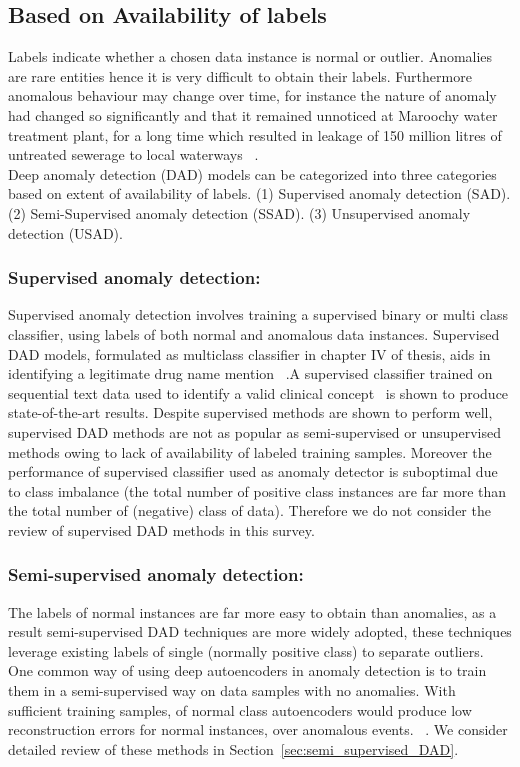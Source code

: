 \subsection{Based on Availability of labels}
Labels indicate whether a chosen data instance is normal or outlier. Anomalies are rare entities hence it is very  difficult to obtain their labels. Furthermore anomalous behaviour may change over time, for instance  the nature of anomaly had changed so significantly and that it  remained unnoticed at Maroochy water treatment plant, for a long time which resulted in leakage of 150 million litres of untreated sewerage to local waterways ~\cite{ramotsoela2018survey}.\\
Deep anomaly detection (DAD) models can be categorized into three categories based on extent of availability of labels. (1) Supervised anomaly detection (SAD). (2) Semi-Supervised anomaly detection (SSAD). (3) Unsupervised anomaly detection (USAD).

\subsubsection{Supervised anomaly detection:}
\label{supervised_learning}
Supervised anomaly detection involves training a supervised binary or multi class classifier, using labels of both normal and anomalous data instances. Supervised DAD models, formulated as multiclass classifier in chapter IV of thesis, aids in identifying a legitimate drug name mention ~\cite{chalapathy2016investigation}.A supervised classifier trained on sequential text data used to identify a valid clinical concept~\cite{chalapathy2016bidirectional} is shown to produce state-of-the-art results.
Despite supervised methods are shown to perform well, supervised DAD methods are not as popular as semi-supervised or unsupervised methods owing to lack of availability of labeled training samples. Moreover the performance of supervised classifier used as anomaly detector is suboptimal due to class imbalance (the total number of positive class instances are far more than the total number of (negative) class of data). Therefore we do not consider the review of supervised DAD methods in this survey.


\subsubsection{Semi-supervised anomaly detection:}
\label{semi_supervised_learning}
The labels of normal instances are far more easy to obtain than anomalies, as a result semi-supervised DAD techniques are more widely adopted, these techniques leverage existing labels of single (normally positive class) to separate outliers. One common way of using deep autoencoders  in anomaly detection is to train them in a semi-supervised way on data samples with no anomalies. With sufficient training samples, of normal class autoencoders would produce low reconstruction errors for normal instances, over anomalous events.
~\cite{wulsin2010semi,nadeem2016semi,song2017hybrid}. We consider detailed review of these methods in  Section~\ref{sec:semi_supervised_DAD}.

